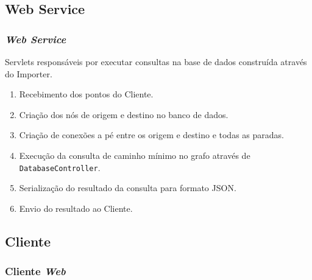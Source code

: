 \subsection{Web Service}
\frame
{
\frametitle{\emph{Web Service}}
Servlets responsáveis por executar consultas na base de dados construída através do Importer.

\begin{enumerate}
\item Recebimento dos pontos do Cliente.
\item Criação dos nós de origem e destino no banco de dados.
\item Criação de conexões a pé entre os origem e destino e todas as paradas.
\item Execução da consulta de caminho mínimo no grafo através de \texttt{DatabaseController}.
\item Serialização do resultado da consulta para formato JSON.
\item Envio do resultado ao Cliente.
\end{enumerate}
}

\subsection{Cliente}
\frame
{
\frametitle{Cliente \emph{Web}}

}